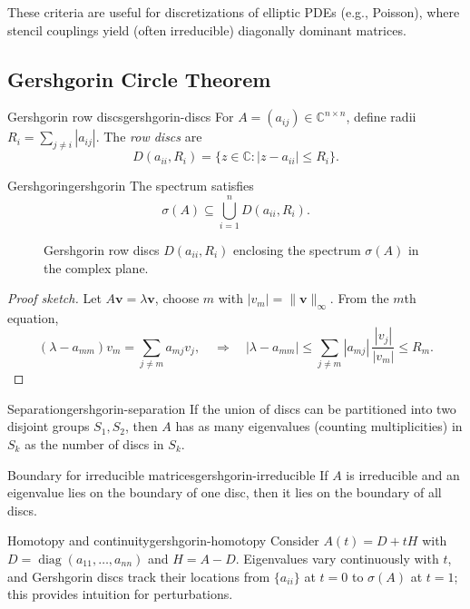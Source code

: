 \documentclass[../../main.tex]{subfiles}
\begin{document}
These criteria are useful for discretizations of elliptic PDEs (e.g., Poisson), where stencil couplings yield (often irreducible) diagonally dominant matrices.

\subsection{Gershgorin Circle Theorem}
\begin{definition}{Gershgorin row discs}{gershgorin-discs}
    For $A=(a_{ij})\in\mathbb{C}^{n\times n}$, define radii $R_i=\sum_{j\ne i}|a_{ij}|$. The \emph{row discs} are
    \[
        D(a_{ii},R_i)=\{ z\in\mathbb{C} : |z-a_{ii}|\le R_i\}.
    \]
\end{definition}

\begin{theorem}{Gershgorin}{gershgorin}
    The spectrum satisfies
    \[
        \sigma(A)\subseteq \bigcup_{i=1}^n D(a_{ii},R_i).
    \]
\end{theorem}

\begin{figure}[H]
    \centering
    
    \caption{Gershgorin row discs $D(a_{ii},R_i)$ enclosing the spectrum $\sigma(A)$ in the complex plane.}
    \label{fig:gershgorin-discs}
\end{figure}

\begin{proof}[Proof sketch]
    Let $A\mathbf{v}=\lambda \mathbf{v}$, choose $m$ with $|v_m|=\|\mathbf{v}\|_\infty$. From the $m$th equation,
    \[
        (\lambda-a_{mm})v_m=\sum_{j\ne m} a_{mj} v_j, \quad \Rightarrow\quad |
        \lambda-a_{mm}|\le \sum_{j\ne m}|a_{mj}|\,\frac{|v_j|}{|v_m|}\le R_m.
    \]
\end{proof}

\begin{theorem}{Separation}{gershgorin-separation}
    If the union of discs can be partitioned into two disjoint groups $S_1, S_2$, then $A$ has as many eigenvalues (counting multiplicities) in $S_k$ as the number of discs in $S_k$.
\end{theorem}

\begin{theorem}{Boundary for irreducible matrices}{gershgorin-irreducible}
    If $A$ is irreducible and an eigenvalue lies on the boundary of one disc, then it lies on the boundary of all discs.
\end{theorem}

\begin{remark}{Homotopy and continuity}{gershgorin-homotopy}
    Consider $A(t)=D+tH$ with $D=\operatorname{diag}(a_{11},\dots,a_{nn})$ and $H=A-D$. Eigenvalues vary continuously with $t$, and Gershgorin discs track their locations from $\{a_{ii}\}$ at $t=0$ to $\sigma(A)$ at $t=1$; this provides intuition for perturbations.
\end{remark}
\end{document}
